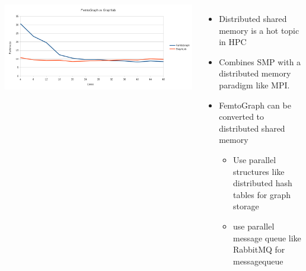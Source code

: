 \documentclass[25pt, portrait,  margin=0mm, innermargin=15mm,
  blockverticalspace=15mm, colspace=15mm, subcolspace=8mm]{tikzposter}
\begin{document}
\begin{columns}
     {
      \setcounter{figurecounter}{98}
      \begin{tikzfigure}
        \includegraphics[width=0.95\linewidth]{vs.png}
        \end{tikzfigure}


    }

     {
      \begin{itemize}
      \item Distributed shared memory is a hot topic in HPC
      \item Combines SMP with a distributed memory paradigm like MPI.
      \item FemtoGraph can be converted to distributed shared memory
        \begin{itemize}
        \item Use parallel structures like distributed hash tables for graph storage
        \item use parallel message queue like RabbitMQ for messagequeue
        \end{itemize}
      \end{itemize}
    }



\end{columns}
\end{document}
